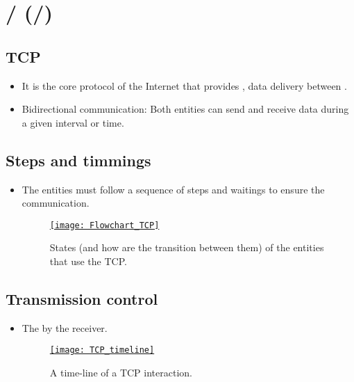 \chapter{/ (/)}

\section{\gls{TCP}}
\begin{itemize}
\item It is the core protocol of the Internet that provides
  , data delivery between
  \cite{wikipedia_TCP}.
\item Bidirectional communication: Both entities can send and receive
  data during a given interval or time.
\end{itemize}

\section{Steps and timmings}
\begin{itemize} 
\item The entities must follow a sequence of steps and waitings to ensure the communication.
\begin{figure}[H]
  \vspace{-0ex}
  \centering
  \href{https://www.ibm.com/support/pages/flowchart-tcp-connections-and-their-definition}{\texttt{[image: Flowchart\_TCP]}}
  \caption{States (and how are the transition between them) of the
    entities that use the \gls{TCP}.}
  \label{fig:TCP_states}
\end{figure}
\end{itemize}


\section{Transmission control}
\begin{itemize} 
\item The  by the receiver.
\begin{figure}[H]
  \vspace{-0ex}
  \centering
  \href{https://ieeexplore.ieee.org/document/8668433}{\texttt{[image: TCP\_timeline]}}
  \caption{A time-line of a \gls{TCP} interaction.}
  \label{fig:TCP_interaction}
\end{figure}
\end{itemize}

